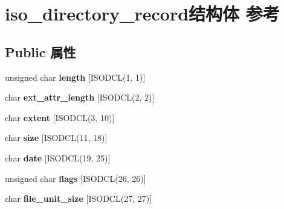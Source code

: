 \hypertarget{structiso__directory__record}{}\section{iso\+\_\+directory\+\_\+record结构体 参考}
\label{structiso__directory__record}
\subsection*{Public 属性}
\begin{DoxyCompactItemize}
\item 
\mbox{\label{structiso__directory__record_ab4c8a46c453bd8508c52a375f9edc1d9}} 
unsigned char {\bfseries length} \mbox{[}I\+S\+O\+D\+CL(1, 1)\mbox{]}
\item 
\mbox{\label{structiso__directory__record_a42606f80fa73d888522fb841f7d1c7a8}} 
char {\bfseries ext\+\_\+attr\+\_\+length} \mbox{[}I\+S\+O\+D\+CL(2, 2)\mbox{]}
\item 
\mbox{\label{structiso__directory__record_a3f0f14c1651f153ee08bc7988fdaf4e5}} 
char {\bfseries extent} \mbox{[}I\+S\+O\+D\+CL(3, 10)\mbox{]}
\item 
\mbox{\label{structiso__directory__record_a82f0da275cb192d074573f108bfaf428}} 
char {\bfseries size} \mbox{[}I\+S\+O\+D\+CL(11, 18)\mbox{]}
\item 
\mbox{\label{structiso__directory__record_a12875cc121e2c0be80b2c604b9212401}} 
char {\bfseries date} \mbox{[}I\+S\+O\+D\+CL(19, 25)\mbox{]}
\item 
\mbox{\label{structiso__directory__record_a690b5f08787a4a8442baf92503ad8ded}} 
unsigned char {\bfseries flags} \mbox{[}I\+S\+O\+D\+CL(26, 26)\mbox{]}
\item 
\mbox{\label{structiso__directory__record_aa20d6b81ee5d78d5f9fef6336de62588}} 
char {\bfseries file\+\_\+unit\+\_\+size} \mbox{[}I\+S\+O\+D\+CL(27, 27)\mbox{]}
\item 
\mbox{\label{structiso__directory__record_a1b3f641b873b70828ce37abc941ac94a}} 

\end{DoxyCompactItemize}

